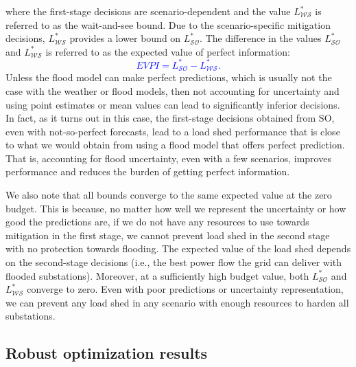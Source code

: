 \documentclass[authoryear,preprint,review,12pt]{elsarticle}\usepackage{amssymb}
\begin{document}
\noindent where the first-stage decisions are scenario-dependent and the value $L_{\mathcal{WS}}^*$ is referred to as the wait-and-see bound. Due to the scenario-specific mitigation decisions, $L_{\mathcal{WS}}^*$ provides a lower bound on $L_{\mathcal{SO}}^*$. The difference in the values $L_{\mathcal{SO}}^*$ and $L_{\mathcal{WS}}^*$ is referred to as the expected value of perfect information:
\textcolor{blue}{
\begin{equation}
    EVPI = L_{\mathcal{SO}}^* - L_{\mathcal{WS}}^*. \label{evpi}
\end{equation}
}
\noindent Unless the flood model can make perfect predictions, which is usually not the case with the weather or flood models, then not accounting for uncertainty and using point estimates or mean values can lead to significantly inferior decisions. In fact, as it turns out in this case, the first-stage decisions obtained from SO, even with not-so-perfect forecasts, lead to a load shed performance that is close to what we would obtain from using a flood model that offers perfect prediction. That is, accounting for flood uncertainty, even with a few scenarios, improves performance and reduces the burden of getting perfect information.

We also note that all bounds converge to the same expected value at the zero budget. This is because, no matter how well we represent the uncertainty or how good the predictions are, if we do not have any resources to use towards mitigation in the first stage, we cannot prevent load shed in the second stage with no protection towards flooding. The expected value of the load shed depends on the second-stage decisions (i.e., the best power flow the grid can deliver with flooded substations). Moreover, at a sufficiently high budget value, both $L_{\mathcal{SO}}^*$ and $L_{\mathcal{WS}}^*$ converge to zero. Even with poor predictions or uncertainty representation, we can prevent any load shed in any scenario with enough resources to harden all substations.

\subsection{Robust optimization results}\label{uncertain prob}
\end{document}
